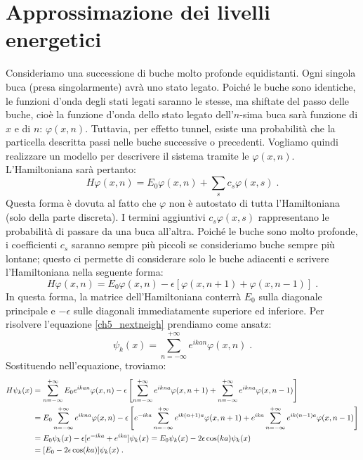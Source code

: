 \documentclass[12pt,a4paper]{report}
\theoremstyle{definition}
\numberwithin{equation}{section}
\begin{document}
\section{Approssimazione dei livelli energetici}
Consideriamo una successione di buche molto profonde equidistanti. Ogni singola buca (presa singolarmente) avrà uno stato legato. Poiché le buche sono identiche, le funzioni d'onda degli stati legati saranno le stesse, ma shiftate del passo delle buche, cioè la funzione d'onda dello stato legato dell'$n$-sima buca sarà funzione di $x$ e di $n$: $\varphi(x,n)$. Tuttavia, per effetto tunnel, esiste una probabilità che la particella descritta passi nelle buche successive o precedenti. Vogliamo quindi realizzare un modello per descrivere il sistema tramite le $\varphi(x,n)$. L'Hamiltoniana sarà pertanto:
\begin{equation}
H\varphi(x,n)=E_0\varphi(x,n)+\sum_{s}c_s\varphi(x,s)\;.
\end{equation}
Questa forma è dovuta al fatto che $\varphi$ non è autostato di tutta l'Hamiltoniana (solo della parte discreta). I termini aggiuntivi $c_s\varphi(x,s)$ rappresentano le probabilità di passare da una buca all'altra. Poiché le buche sono molto profonde, i coefficienti $c_s$ saranno sempre più piccoli se consideriamo buche sempre più lontane; questo ci permette di considerare solo le buche adiacenti e scrivere l'Hamiltoniana nella seguente forma:
\begin{equation}
H\varphi(x,n)=E_0\varphi(x,n)-\epsilon[\varphi(x,n+1)+\varphi(x,n-1)]\;. \label{ch5_nextneigh}
\end{equation}
In questa forma, la matrice dell'Hamiltoniana conterrà $E_0$ sulla diagonale principale e $-\epsilon$ sulle diagonali immediatamente superiore ed inferiore. Per risolvere l'equazione \eqref{ch5_nextneigh} prendiamo come ansatz:
\begin{equation}
\psi_k(x)=\sum_{n=-\infty}^{+\infty} e^{ikan}\varphi(x,n)\;.
\end{equation}
Sostituendo nell'equazione, troviamo:
\begin{align}
H\psi_k(x) &= \sum_{n=-\infty}^{+\infty} E_0e^{ikan}\varphi(x,n)-\epsilon\left[\sum_{n=-\infty}^{+\infty}e^{ikna}\varphi(x,n+1)+\sum_{n=-\infty}^{+\infty}e^{ikna}\varphi(x,n-1)\right] \notag \\
&= E_0\sum_{n=-\infty}^{+\infty}e^{ikna}\varphi(x,n)-\epsilon\left[e^{-ika}\sum_{n=-\infty}^{+\infty} e^{ik(n+1)a}\varphi(x,n+1)+e^{ika}\sum_{n=-\infty}^{+\infty}e^{ik(n-1)a}\varphi(x,n-1)\right] \notag \\
&= E_0\psi_k(x)-\epsilon[e^{-ika}+e^{ika}]\psi_k(x) = E_0\psi_k(x)-2\epsilon\cos(ka)\psi_k(x)  \notag \\
&= [E_0-2\epsilon\cos(ka)]\psi_k(x)\;.
\end{align}
\end{document}

